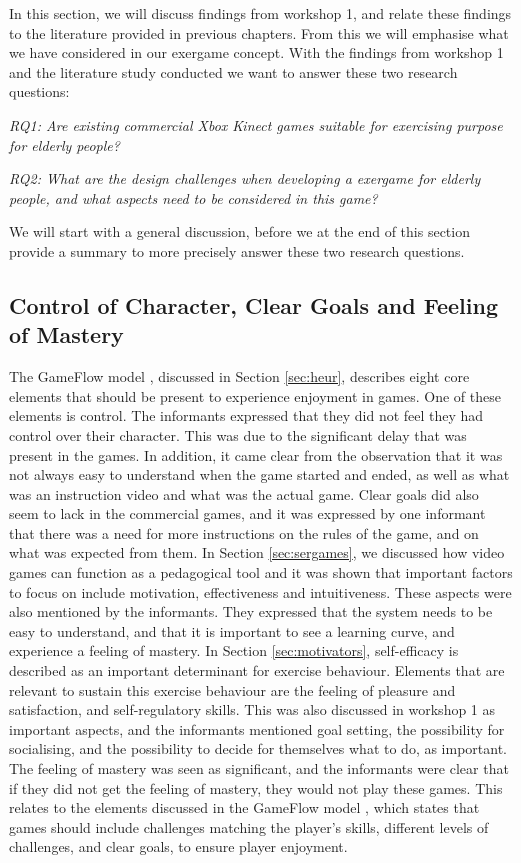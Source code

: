 In this section, we will discuss findings from workshop 1, and relate these findings to the literature provided in previous chapters. From this we will emphasise what we have considered in our exergame concept. With the findings from workshop 1 and the literature study conducted we want to answer these two research questions: 

\emph{RQ1: Are existing commercial Xbox Kinect games suitable for exercising purpose for elderly people?}

\emph{RQ2: What are the design challenges when developing a exergame for elderly people, and what aspects need to be considered in this game?}

We will start with a general discussion, before we at the end of this section provide a summary to more precisely answer these two research questions. 

\subsection{Control of Character, Clear Goals and Feeling of Mastery}
The GameFlow model \cite{sweetser}, discussed in Section \ref{sec:heur}, describes eight core elements that should be present to experience enjoyment in games. One of these elements is control. The informants expressed that they did not feel they had control over their character. This was due to the significant delay that was present in the games. In addition, it came clear from the observation that it was not always easy to understand when the game started and ended, as well as what was an instruction video and what was the actual game. Clear goals did also seem to lack in the commercial games, and it was expressed by one informant that there was a need for more instructions on the rules of the game, and on what was expected from them. In Section \ref{sec:sergames}, we discussed how video games can function as a pedagogical tool and it was shown that important factors to focus on include motivation, effectiveness and intuitiveness. These aspects were also mentioned by the informants. They expressed that the system needs to be easy to understand, and that it is important to see a learning curve, and experience a feeling of mastery. In Section \ref{sec:motivators}, self-efficacy is described as an important determinant for exercise behaviour. Elements that are relevant to sustain this exercise behaviour are the feeling of pleasure and satisfaction, and self-regulatory skills. This was also discussed in workshop 1 as important aspects, and the informants mentioned goal setting, the possibility for socialising, and the possibility to decide for themselves what to do, as important. The feeling of mastery was seen as significant, and the informants were clear that if they did not get the feeling of mastery, they would not play these games. This relates to the elements discussed in the GameFlow model \cite{sweetser}, which states that games should include challenges matching the player's skills, different levels of challenges, and clear goals, to ensure player enjoyment. 

